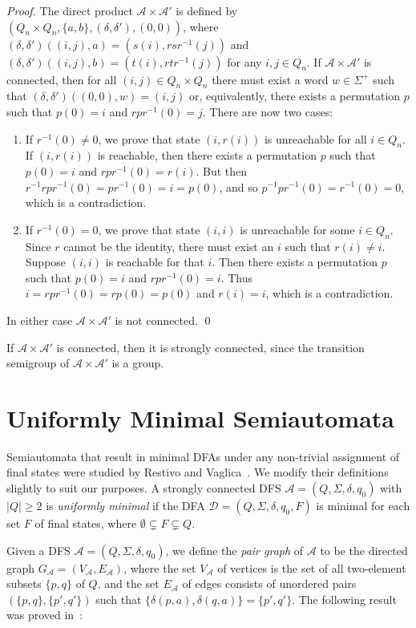 \documentclass{llncs}
\newcommand{\emp}{\emptyset}
\newcommand{\Sig}{\Sigma}
\newcommand{\be}{\begin{enumerate}}
\newcommand{\ee}{\end{enumerate}}
\newcommand{\cA}{{\mathcal A}}
\newcommand{\cD}{{\mathcal D}}
\begin{document}
\begin{proof}
The direct product $\cA\times \cA'$ is defined by $(Q_n\times Q_n,\{a,b\},
(\delta,\delta'),(0,0))$, where  $(\delta,\delta')((i,j),a) = (s(i),rsr^{-1}(j))$ and
$(\delta,\delta')((i,j),b) = (t(i),rtr^{-1}(j))$ for any $i,j\in Q_n$.  If $\cA\times \cA'$ is connected, then for all $(i,j)\in
Q_n\times Q_n$ there must exist a word $w\in \Sigma^{+}$ such that
$(\delta,\delta')((0,0),w)=(i,j)$ or, equivalently, there exists a permutation
$p$ such that $p(0)=i$ and $rpr^{-1}(0)=j$. 
There are now two cases:
\be 
\item
If $r^{-1}(0) \not= 0$, we prove that state $(i,r(i))$ is unreachable for all $i \in  Q_n$.
If $(i,r(i))$ is reachable, then there exists a permutation $p$ such that
$p(0)=i$ and $rpr^{-1}(0)=r(i)$. But then $r^{-1}rpr^{-1}(0)=pr^{-1}(0)=i=p(0)$, and so
$p^{-1}pr^{-1}(0)=r^{-1}(0)=0$, which is a contradiction.
\item
If $r^{-1}(0)= 0$, we prove that state $(i,i)$ is unreachable for some $i \in  Q_n$.
Since $r$ cannot be the identity, there must exist an $i$ such 
that $r(i)\not=i$. Suppose $(i,i)$ is reachable for that $i$.
Then there exists a permutation
$p$ such that $p(0)=i$ and $rpr^{-1}(0)=i$. 
Thus $i=rpr^{-1}(0)=rp(0)=p(0)$ and 
$r(i)=i$, which is a contradiction.
\ee

In either case   $\cA\times \cA'$ is not connected. 
\qed
\end{proof}

\begin{remark}
\label{rem:sc}
If $\cA\times \cA'$ is connected, then it is strongly connected, since the transition semigroup of $\cA\times \cA'$ is a group.
\end{remark}

\section{Uniformly Minimal Semiautomata}
\label{sec:uniform}
Semiautomata that result in minimal DFAs under any non-trivial assignment of final states were studied by Restivo and Vaglica~\cite{ReVa12}.
We modify their definitions slightly to suit our purposes.
A strongly connected DFS $\cA=(Q,\Sig,\delta,q_0)$ with $|Q|\ge 2$ is \emph{uniformly minimal}
if the DFA $\cD=(Q,\Sig,\delta,q_0,F)$ is minimal for each set $F$ of final states, where $\emp\subsetneq F\subsetneq Q$.

Given a DFS $\cA=(Q,\Sig,\delta,q_0)$, we define the \emph{pair graph}
of $\cA$ to be the directed graph $G_\cA=(V_\cA,E_\cA)$, where the set $V_\cA$ of vertices  is the set of all two-element subsets $\{p,q\}$ of $Q$, and the set $E_\cA$ of edges consists of unordered pairs $(\{p,q\},\{p',q'\})$ such that 
$\{\delta(p,a),\delta(q,a)\}=\{p',q'\}$.
The following result was proved in~\cite{ReVa12}:
\end{document}
